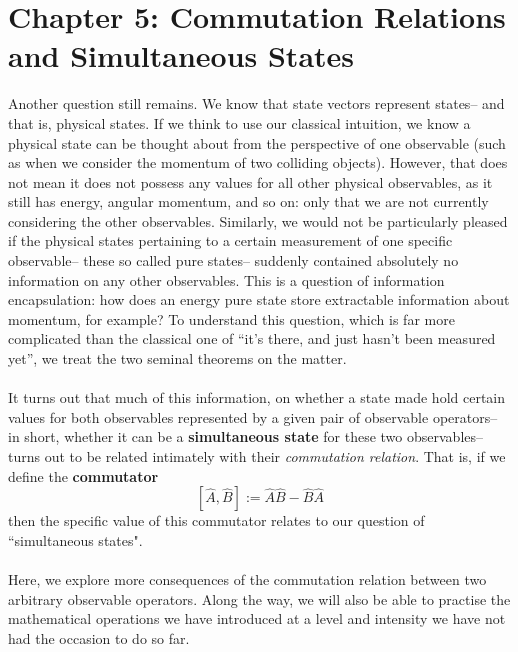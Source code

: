 \chapter{Chapter 5: Commutation Relations and Simultaneous States}
Another question still remains. We know that state vectors represent states-- and that is, physical states. If we think to use our classical intuition, we know a physical state can be thought about from the perspective of one observable (such as when we consider the momentum of two colliding objects). However, that does not mean it does not possess any values for all other physical observables, as it still has energy, angular momentum, and so on: only that we are not currently considering the other observables. Similarly, we would not be particularly pleased if the physical states pertaining to a certain measurement of one specific observable-- these so called pure states-- suddenly contained absolutely no information on any other observables. This is a question of information encapsulation: how does an energy pure state store extractable information about momentum, for example? To understand this question, which is far more complicated than the classical one of ``it's there, and just hasn't been measured yet'', we treat the two seminal theorems on the matter. 
\\\\
It turns out that much of this information, on whether a state made hold certain values for both observables represented by a given pair of observable operators-- in short, whether it can be a \textbf{simultaneous state} for these two observables-- turns out to be related intimately with their \textit{commutation relation}. That is, if we define the \textbf{commutator}
$$
[\hat{A},\hat{B}] := \hat{A}\hat{B}-\hat{B}\hat{A}
$$
then the specific value of this commutator relates to our question of ``simultaneous states".
\\\\
Here, we explore more consequences of the commutation relation between two arbitrary observable operators. Along the way, we will also be able to practise the mathematical operations we have introduced at a level and intensity we have not had the occasion to do so far.
